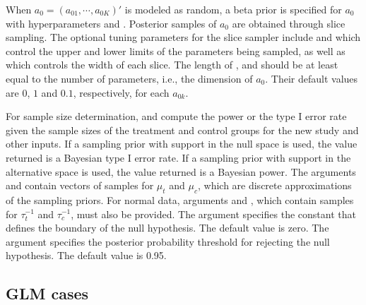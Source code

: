 When $a_0 = (a_{01},\cdots,a_{0K})'$ is modeled as random, a beta prior is specified for $a_0$ with hyperparameters  and . Posterior samples of $a_0$ are obtained through slice sampling. The optional tuning parameters for the slice sampler include  and  which control the upper and lower limits of the parameters being sampled, as well as  which controls the width of each slice. The length of ,  and  should be at least equal to the number of parameters, i.e., the dimension of $a_0$. Their default values are $0$, $1$ and $0.1$, respectively, for each $a_{0k}$.

For sample size determination,  and  compute the power or the type I error rate given the sample sizes of the treatment and control groups for the new study and other inputs. If a sampling prior with support in the null space is used, the value returned is a Bayesian type I error rate. If a sampling prior with support in the alternative space is used, the value returned is a Bayesian power. The arguments  and  contain vectors of samples for $\mu_t$ and $\mu_c$, which are discrete approximations of the sampling priors. For normal data, arguments  and , which contain samples for $\tau_t^{-1}$ and $\tau_c^{-1}$, must also be provided. The argument  specifies the constant that defines the boundary of the null hypothesis. The default value is zero. The argument  specifies the posterior probability threshold for rejecting the null hypothesis. The default value is 0.95.

\subsection*{GLM cases}\label{sec:useGLM}

